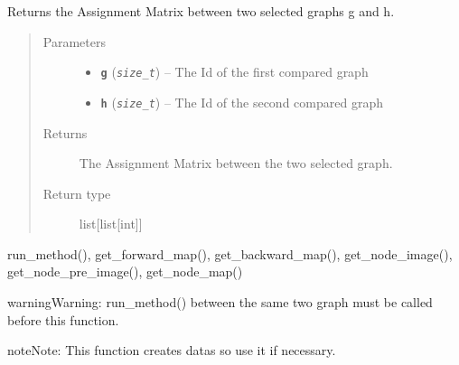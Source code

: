 \documentclass[letterpaper,10pt,english]{sphinxmanual}
\begin{document}

\begin{fulllineitems}
\label{doc:gedlibpy.get_assignment_matrix}
Returns the Assignment Matrix between two selected graphs g and h.
\begin{quote}\begin{description}
\item[{Parameters}] \leavevmode\begin{itemize}
\item {} 
\textbf{\texttt{g}} (\emph{\texttt{size\_t}}) -- The Id of the first compared graph

\item {} 
\textbf{\texttt{h}} (\emph{\texttt{size\_t}}) -- The Id of the second compared graph

\end{itemize}

\item[{Returns}] \leavevmode
The Assignment Matrix between the two selected graph.

\item[{Return type}] \leavevmode
list{[}list{[}int{]}{]}

\end{description}\end{quote}




run\_method(), get\_forward\_map(), get\_backward\_map(), get\_node\_image(), get\_node\_pre\_image(), get\_node\_map()



\begin{notice}{warning}{Warning:}
run\_method() between the same two graph must be called before this function.
\end{notice}

\begin{notice}{note}{Note:}
This function creates datas so use it if necessary.
\end{notice}

\end{fulllineitems}

\end{document}

